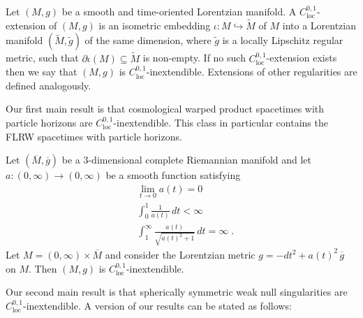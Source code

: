 \documentclass[reqno]{article}
\newcommand{\loc}{\mathrm{loc}}
\begin{document}
Let $(M,g)$ be a smooth and time-oriented Lorentzian manifold. A $C^{0,1}_{\loc}$-extension of $(M,g)$ is an isometric embedding $\iota : M \hookrightarrow \tilde{M}$ of $M$ into a Lorentzian manifold $(\tilde{M}, \tilde{g})$ of the same dimension, where $\tilde{g}$ is a locally Lipschitz regular metric, such that $\partial \iota(M) \subseteq \tilde{M}$ is non-empty. If no such $C^{0,1}_{\loc}$-extension exists then we say that $(M,g)$ is $C^{0,1}_{\loc}$-inextendible. Extensions of other regularities are defined analogously. 

Our first main result is that cosmological warped product spacetimes with particle horizons are $C^{0,1}_{\loc}$-inextendible. This class in particular contains the FLRW spacetimes with particle horizons.

\begin{theorem} \label{ThmInt1}
Let $(\overline{M}, \overline{g})$ be a $3$-dimensional complete Riemannian manifold and let $a : (0, \infty) \to (0, \infty)$ be a smooth function satisfying \begin{equation*} \begin{aligned}&\lim_{ t \to 0} a(t) = 0 \\
&\int_0^1 \frac{1}{a(t)} \, dt < \infty \\
&\int_1^\infty \frac{a(t)}{ \sqrt{a(t)^2 + 1}}\, dt = \infty \;. \end{aligned} \end{equation*} Let $M = (0, \infty) \times \overline{M}$ and consider the Lorentzian metric $g = -dt^2 + a(t)^2 \, \overline{g}$ on $M$. Then $(M,g)$ is $C^{0,1}_{\loc}$-inextendible.
\end{theorem}

Our second main result is that spherically symmetric weak null singularities are $C^{0,1}_{\loc}$-inextendible. A version of our results can be stated as follows:
\end{document}
